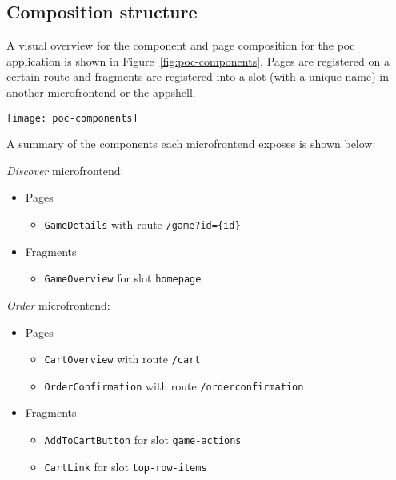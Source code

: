 \subsection{Composition structure}
\label{ssec:poc-composition}

A visual overview for the component and page composition for the \gls{poc}
application is shown in Figure~\ref{fig:poc-components}. Pages are registered on
a certain route and fragments are registered into a slot (with a unique name) in
another \gls{microfrontend} or the \gls{appshell}.

\begin{sidewaysfigure}
  \centering
  \texttt{[image: poc-components]}
  \caption[Visual overview for proof-of-concept solution]{A visual overview for
  the component and page composition for the \gls{poc} application. The colored
  dashed lines indicate the sources of the components (blue for
  \textit{``Order''} \gls{microfrontend}, orange for \textit{``Discover''}).}
  \label{fig:poc-components}
\end{sidewaysfigure}

\begin{keeptogether}
  A summary of the components each \gls{microfrontend} exposes is shown below:
  \begin{framed}
    \textit{Discover}  \gls{microfrontend}:
      \begin{itemize}
        \item[] Pages
        \begin{itemize}
          \item \texttt{GameDetails} with route \texttt{/game?id=\{id\}}
        \end{itemize}
        \item[] Fragments
        \begin{itemize}
          \item \texttt{GameOverview} for slot \texttt{homepage}
        \end{itemize}
      \end{itemize}
    \textit{Order} \gls{microfrontend}:
      \begin{itemize}
        \item[] Pages
        \begin{itemize}
          \item \texttt{CartOverview} with route \texttt{/cart}
          \item \texttt{OrderConfirmation} with route \texttt{/orderconfirmation}
        \end{itemize}
        \item[] Fragments
        \begin{itemize}
          \item \texttt{AddToCartButton} for slot \texttt{game-actions}
          \item \texttt{CartLink} for slot \texttt{top-row-items}
        \end{itemize}
      \end{itemize}
  \end{framed} 
\end{keeptogether}


